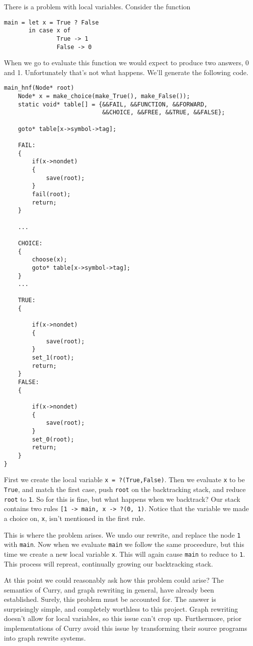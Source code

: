 
There is a problem with local variables.
Consider the function

\begin{verbatim}
main = let x = True ? False
       in case x of
               True -> 1
               False -> 0
\end{verbatim}

When we go to evaluate this function we would expect to produce two answers, 0 and 1.
Unfortunately that's not what happens.
We'll generate the following code.
\begin{verbatim}
main_hnf(Node* root)
    Node* x = make_choice(make_True(), make_False());
    static void* table[] = {&&FAIL, &&FUNCTION, &&FORWARD, 
                            &&CHOICE, &&FREE, &&TRUE, &&FALSE};
    
    goto* table[x->symbol->tag];
  
    FAIL:
    {
        if(x->nondet)
        {
            save(root);
        }
        fail(root);
        return;
    }
 
    ...
  
    CHOICE:
    {
        choose(x);
        goto* table[x->symbol->tag];
    }
    ...
  
    TRUE:
    {

        if(x->nondet)
        {
            save(root);
        }
        set_1(root);
        return;
    }
    FALSE:
    {

        if(x->nondet)
        {
            save(root);
        }
        set_0(root);
        return;
    }
}
\end{verbatim}

First we create the local variable \texttt{x = ?(True,False)}.
Then we evaluate \texttt{x} to be \texttt{True}, and match the first case, 
push \texttt{root} on the backtracking stack, and reduce \texttt{root} to \texttt 1.
So for this is fine, but what happens when we backtrack?
Our stack contains two rules \texttt{[1 -> main, x -> ?(0, 1)}.
Notice that the variable we made a choice on, \texttt x, isn't mentioned in the first rule.

This is where the problem arises.  We undo our rewrite, and replace the node \texttt 1 with \texttt{main}.
Now when we evaluate \texttt{main} we follow the same proceedure,
but this time we create a new local variable \texttt{x}.
This will again cause \texttt{main} to reduce to \texttt 1.
This process will repreat, continually growing our backtracking stack.

At this point we could reasonably ask how this problem could arise?
The semantics of Curry, and graph rewriting in general, have already been established.
Surely, this problem must be accounted for.
The answer is surprisingly simple, and completely worthless to this project.
Graph rewriting doesn't allow for local variables, so this issue can't crop up.
Furthermore, prior implementations of Curry avoid this issue by transforming their
source programs into graph rewrite systems.


